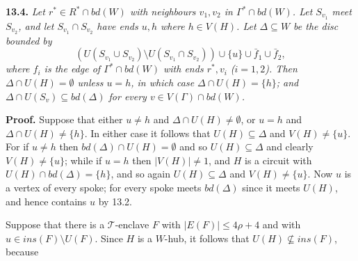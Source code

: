 \textbf{13.4.} \textit{Let $r^* \in R^* \cap bd(W)$ with neighbours $v_1, v_2$ in $\Gamma^* \cap bd(W)$. Let $S_{v_1}$ meet $S_{v_2}$, and let $S_{v_1} \cap S_{v_2}$ have ends $u, h$ where $h \in V(H)$. Let $\Delta \subseteq W$ be the disc bounded by}
\begin{equation*}
(U(S_{v_1} \cup S_{v_2}) \setminus U(S_{v_1} \cap S_{v_2})) \cup \{u\} \cup \bar{f}_1 \cup \bar{f}_2,
\end{equation*}
\textit{where $f_i$ is the edge of $\Gamma^* \cap bd(W)$ with ends $r^*, v_i$ ($i = 1, 2$). Then $\Delta \cap U(H) = \emptyset$ unless $u = h$, in which case $\Delta \cap U(H) = \{h\}$; and $\Delta \cap U(S_v) \subseteq bd(\Delta)$ for every $v \in V(\Gamma) \cap bd(W)$.}

\textbf{Proof.} Suppose that either $u \ne h$ and $\Delta \cap U(H) \ne \emptyset$, or $u = h$ and $\Delta \cap U(H) \ne \{h\}$. In either case it follows that $U(H) \subseteq \Delta$ and $V(H) \ne \{u\}$. For if $u \ne h$ then $bd(\Delta) \cap U(H) = \emptyset$ and so $U(H) \subseteq \Delta$ and clearly $V(H) \ne \{u\}$; while if $u = h$ then $|V(H)| \ne 1$, and $H$ is a circuit with $U(H) \cap bd(\Delta) = \{h\}$, and so again $U(H) \subseteq \Delta$ and $V(H) \ne \{u\}$. Now $u$ is a vertex of every spoke; for every spoke meets $bd(\Delta)$ since it meets $U(H)$, and hence contains $u$ by 13.2.

Suppose that there is a $\mathscr{T}$-enclave $F$ with $|E(F)| \le 4\rho + 4$ and with $u \in ins(F) \setminus U(F)$. Since $H$ is a $W$-hub, it follows that $U(H) \nsubseteq ins(F)$, because
